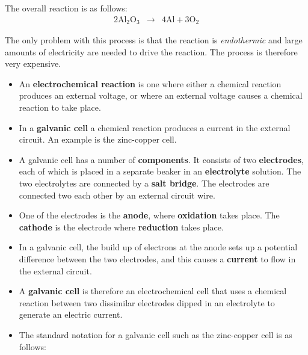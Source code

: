 The overall reaction is as follows:
\begin{eqnarray*}
  2\text{Al}_{2}\text{O}_{3} &\rightarrow& 4\text{Al} + 3\text{O}_{2}
\end{eqnarray*}

The only problem with this process is that the reaction is \textit{endothermic} and large amounts of electricity are needed to drive the reaction. The process is therefore very expensive.


\begin{itemize}
\item{An \textbf{electrochemical reaction} is one where either a chemical reaction produces an external voltage, or where an external voltage causes a chemical reaction to take place.}
\item{In a \textbf{galvanic cell} a chemical reaction produces a current in the external circuit. An example is the zinc-copper cell.}
\item{A galvanic cell has a number of \textbf{components}. It consists of two \textbf{electrodes}, each of which is placed in a separate beaker in an \textbf{electrolyte} solution. The two electrolytes are connected by a \textbf{salt bridge}. The electrodes are connected two each other by an external circuit wire.}
\item{One of the electrodes is the \textbf{anode}, where \textbf{oxidation} takes place. The \textbf{cathode} is the electrode where \textbf{reduction} takes place.}
\item{In a galvanic cell, the build up of electrons at the anode sets up a potential difference between the two electrodes, and this causes a \textbf{current} to flow in the external circuit.}   
\item{A \textbf{galvanic cell} is therefore an electrochemical cell that uses a chemical reaction between two dissimilar electrodes dipped in an electrolyte to generate an electric current.}
\item{The standard notation for a galvanic cell such as the zinc-copper cell is as follows:

}
\end{itemize}
